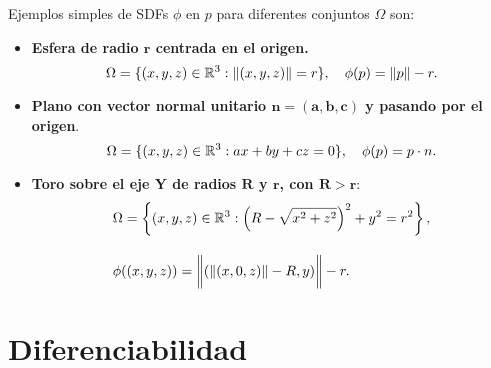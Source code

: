 \begin{ejemplo}\label{ej:sdf}
    Ejemplos simples de SDFs $\phi$ en $p$ para diferentes conjuntos $\Omega$ son:
    \begin{itemize}
        \item \textbf{Esfera de radio $\boldsymbol{r}$ centrada en el origen.}
        \begin{equation*}
            \Omega=\{(x,y,z)\in \mathbb{R}^3 : \Vert (x,y,z)\Vert = r\},\quad \phi(p) = \Vert p\Vert - r.
        \end{equation*}
        \item \textbf{Plano con vector normal unitario $\boldsymbol{n=(a,b,c)}$ y pasando por el origen}.
        \begin{equation*}
            \Omega=\{(x,y,z)\in\mathbb{R}^3 : ax+by+cz = 0\},\quad \phi(p) = p\cdot n.
        \end{equation*}
        \item \textbf{Toro sobre el eje Y de radios $\boldsymbol{R}$ y $\boldsymbol{r}$, con $\boldsymbol{R>r}$}:
        \begin{align*}
            &\Omega=\left\{(x,y,z)\in \mathbb{R}^3 : \left(R-\sqrt{x^2+z^2}\right)^2 + y^2 = r^2\right\},\\[10pt]
            &\phi((x,y,z))= \bigg\Vert (\Vert(x,0,z)\Vert - R, y) \bigg\Vert - r.
        \end{align*}
    \end{itemize}
\end{ejemplo}

\section{Diferenciabilidad}\label{sec:dif}



